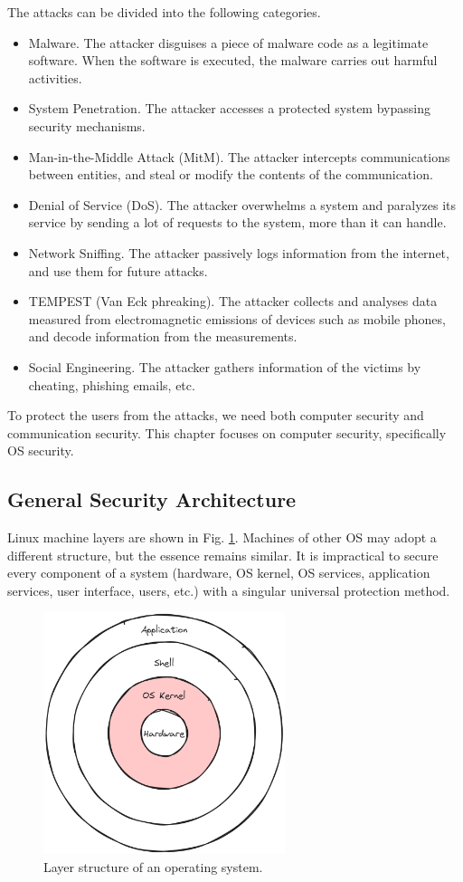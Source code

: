 The attacks can be divided into the following categories.
\begin{itemize}
	\item Malware. The attacker disguises a piece of malware code as a legitimate software. When the software is executed, the malware carries out harmful activities.
	\item System Penetration. The attacker accesses a protected system bypassing security mechanisms.
	\item Man-in-the-Middle Attack (MitM). The attacker intercepts communications between entities, and steal or modify the contents of the communication.
	\item Denial of Service (DoS). The attacker overwhelms a system and paralyzes its service by sending a lot of requests to the system, more than it can handle.
	\item Network Sniffing. The attacker passively logs information from the internet, and use them for future attacks.
	\item TEMPEST (Van Eck phreaking). The attacker collects and analyses data measured from electromagnetic emissions of devices such as mobile phones, and decode information from the measurements.
	\item Social Engineering. The attacker gathers information of the victims by cheating, phishing emails, etc. 
\end{itemize}

To protect the users from the attacks, we need both computer security and communication security. This chapter focuses on computer security, specifically OS security.

\subsection{General Security Architecture}

Linux machine layers are shown in Fig. \ref{ch:ossec:fig:layerstructure}. Machines of other OS may adopt a different structure, but the essence remains similar. It is impractical to secure every component of a system (hardware, OS kernel, OS services, application services, user interface, users, etc.) with a singular universal protection method.

\begin{figure}
	\centering
	\includegraphics[width=200pt]{chapters/ch-computer-security-basics/figures/os_layer.png}
	\caption{Layer structure of an operating system.} \label{ch:ossec:fig:layerstructure}
\end{figure}


